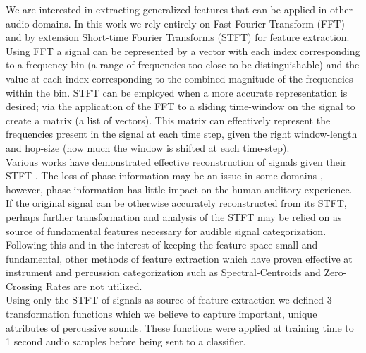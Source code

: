 \documentclass{nime-alternate} %
\begin{document}
We are interested in extracting generalized features that can be applied in other audio domains. In this work we rely entirely on Fast Fourier Transform (FFT) and by extension Short-time Fourier Transforms (STFT) for feature extraction. Using FFT a signal can be represented by a vector with each index corresponding to a frequency-bin (a range of frequencies too close to be distinguishable) and the value at each index corresponding to the combined-magnitude of the frequencies within the bin. STFT can be employed when a more accurate representation is desired; via the application of the FFT to a sliding time-window on the signal to create a matrix (a list of vectors). This matrix can effectively represent the frequencies present in the signal at each time step, given the right window-length and hop-size (how much the window is shifted at each time-step).\\
Various works have demonstrated effective reconstruction of signals given their STFT \cite{nawab1983signal,griffin1984signal}. The loss of phase information may be an issue in some domains \cite{sturmel2011signal}, however, phase information has little impact on the human auditory experience. If the original signal can be otherwise accurately reconstructed from its STFT, perhaps further transformation and analysis of the STFT may be relied on as source of fundamental features necessary for audible signal categorization. Following this and in the interest of keeping the feature space small and fundamental, other methods of feature extraction which have proven effective at instrument and percussion categorization such as Spectral-Centroids \cite{schubert2004spectral} and Zero-Crossing Rates \cite{gouyon2000use} are not utilized.\\
Using only the STFT of signals as source of feature extraction we defined 3 transformation functions which we believe to capture important, unique attributes of percussive sounds. These functions were applied at training time to 1 second audio samples before being sent to a classifier. 
\end{document}
